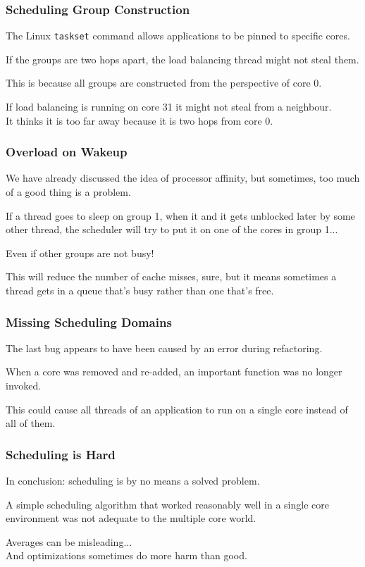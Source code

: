 \begin{frame}
\frametitle{Scheduling Group Construction}

The Linux \texttt{taskset} command allows applications to be pinned to specific cores. 

If the groups are two hops apart, the load balancing thread might not steal them. 

This is because all groups are constructed from the perspective of core 0. 

If load balancing is running on core 31 it might not steal from a neighbour.\\
\quad It thinks it is too far away because it is two hops from core 0.

\end{frame}



\begin{frame}
\frametitle{Overload on Wakeup}

We have already discussed the idea of processor affinity, but sometimes, too much of a good thing is a problem. 

If a thread goes to sleep on group 1, when it and it gets unblocked later by some other thread, the scheduler will try to put it on one of the cores in group 1... 

Even if other groups are not busy! 

This will reduce the number of cache misses, sure, but it means sometimes a thread gets in a queue that's busy rather than one that's free.

\end{frame}




\begin{frame}
\frametitle{Missing Scheduling Domains}

The last bug appears to have been caused by an error during refactoring. 

When a core was removed and re-added, an important function was no longer invoked.

This could cause all threads of an application to run on a single core instead of all of them. 

\end{frame}



\begin{frame}
\frametitle{Scheduling is Hard}

In conclusion: scheduling is by no means a solved problem. 

A simple scheduling algorithm that worked reasonably well in a single core environment was not adequate to the multiple core world. 

Averages can be misleading...\\
\quad And optimizations sometimes do more harm than good. 

\end{frame}



